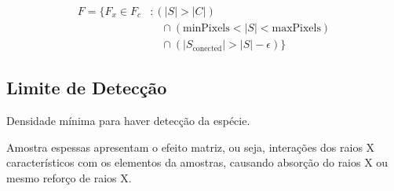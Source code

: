\begin{equation}
\begin{split}
F = \{F_{x} \in  F_{c} &: (|S| > |C|) \\
 &\quad \cap (\text{minPixels}  < |S| < \text{maxPixels}) \\
 &\quad \cap (|S_{\text{conected}}| > |S| - \epsilon) \}
\end{split}
\end{equation}

\subsection{Limite de Detecção}

Densidade mínima para haver detecção da espécie. %

Amostra espessas apresentam o efeito matriz, ou seja, interações dos 
raios X característicos com os elementos da amostras, causando 
absorção do raios X ou mesmo reforço de raios X.





